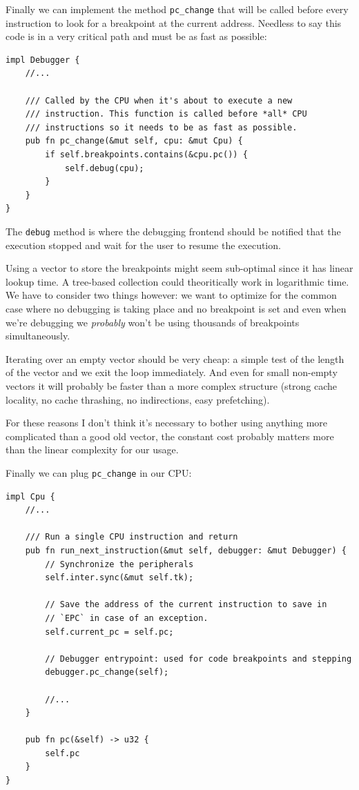 \documentclass[a4paper]{article}
\newcommand{\code}[1] {\texttt{#1}}
\begin{document}
Finally we can implement the method \code{pc\_change} that will be
called before every instruction to look for a breakpoint at the
current address. Needless to say this code is in a very critical path
and must be as fast as possible:

\begin{lstlisting}
impl Debugger {
    //...

    /// Called by the CPU when it's about to execute a new
    /// instruction. This function is called before *all* CPU
    /// instructions so it needs to be as fast as possible.
    pub fn pc_change(&mut self, cpu: &mut Cpu) {
        if self.breakpoints.contains(&cpu.pc()) {
            self.debug(cpu);
        }
    }
}
\end{lstlisting}

The \code{debug} method is where the debugging frontend should be
notified that the execution stopped and wait for the user to resume
the execution.

Using a vector to store the breakpoints might seem sub-optimal since
it has linear lookup time. A tree-based collection could theoritically
work in logarithmic time. We have to consider two things however: we
want to optimize for the common case where no debugging is taking
place and no breakpoint is set and even when we're debugging we
\emph{probably} won't be using thousands of breakpoints
simultaneously.

Iterating over an empty vector should be very cheap: a simple test of
the length of the vector and we exit the loop immediately. And even
for small non-empty vectors it will probably be faster than a more
complex structure (strong cache locality, no cache thrashing, no
indirections, easy prefetching).

For these reasons I don't think it's necessary to bother using
anything more complicated than a good old vector, the constant cost
probably matters more than the linear complexity for our usage.

Finally we can plug \code{pc\_change} in our CPU:

\begin{lstlisting}
impl Cpu {
    //...

    /// Run a single CPU instruction and return
    pub fn run_next_instruction(&mut self, debugger: &mut Debugger) {
        // Synchronize the peripherals
        self.inter.sync(&mut self.tk);

        // Save the address of the current instruction to save in
        // `EPC` in case of an exception.
        self.current_pc = self.pc;

        // Debugger entrypoint: used for code breakpoints and stepping
        debugger.pc_change(self);

        //...
    }

    pub fn pc(&self) -> u32 {
        self.pc
    }
}
\end{lstlisting}
\end{document}
